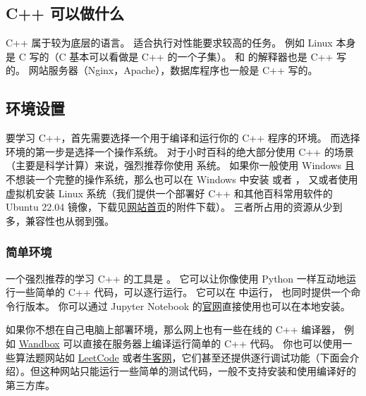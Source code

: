 

\begin{issues}
\issueDraft
\end{issues}

\subsection{C++ 可以做什么}
C++ 属于较为底层的语言。 适合执行对性能要求较高的任务。 例如 Linux 本身是 C 写的（C 基本可以看做是 C++ 的一个子集）。  和  的解释器也是 C++ 写的。 网站服务器（Nginx，Apache），数据库程序也一般是 C++ 写的。

\subsection{环境设置}

要学习 C++，首先需要选择一个用于编译和运行你的 C++ 程序的环境。 而选择环境的第一步是选择一个操作系统。 对于小时百科的绝大部分使用 C++ 的场景（主要是科学计算）来说，强烈推荐你使用  系统。 如果你一般使用 Windows 且不想装一个完整的操作系统，那么也可以在 Windows 中安装  或者 ， 又或者使用  虚拟机安装 Linux 系统（我们提供一个部署好 C++ 和其他百科常用软件的 Ubuntu 22.04 镜像，下载见\href{https://wuli.wiki}{网站首页}的附件下载）。 三者所占用的资源从少到多，兼容性也从弱到强。

\subsubsection{简单环境}
一个强烈推荐的学习 C++ 的工具是 。 它可以让你像使用 Python 一样互动地运行一些简单的 C++ 代码，可以逐行运行。 它可以在  中运行， 也同时提供一个命令行版本。 你可以通过 Jupyter Notebook 的\href{https://jupyter.org/}{官网}直接使用也可以在本地安装。

如果你不想在自己电脑上部署环境，那么网上也有一些在线的 C++ 编译器， 例如 \href{https://wandbox.org/}{Wandbox} 可以直接在服务器上编译运行简单的 C++ 代码。 你也可以使用一些算法题网站如 \href{https://leetcode.com/}{LeetCode} 或者\href{https://www.nowcoder.com/}{牛客网}，它们甚至还提供逐行调试功能（下面会介绍）。但这种网站只能运行一些简单的测试代码，一般不支持安装和使用编译好的第三方库。

